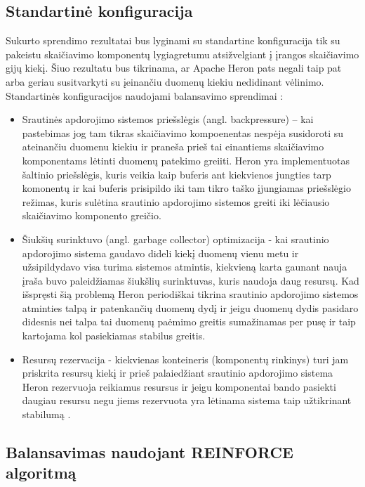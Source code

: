 \documentclass{VUMIFPSbakalaurinis}
\begin{document}
\subsection{Standartinė konfiguracija}
Sukurto sprendimo rezultatai bus lyginami su standartine konfiguracija tik su pakeistu skaičiavimo komponentų lygiagretumu atsižvelgiant į įrangos skaičiavimo gijų kiekį. Šiuo rezultatu bus tikrinama, ar Apache Heron pats negali taip pat arba geriau susitvarkyti su įeinančiu duomenų kiekiu nedidinant vėlinimo. Standartinės konfiguracijos naudojami balansavimo sprendimai \cite{twitterHeron}:
\begin{itemize}
    \item Srautinės apdorojimo sistemos priešslėgis (angl. backpressure) – kai pastebimas jog tam tikras skaičiavimo kompoenentas nespėja susidoroti su ateinančiu duomenu kiekiu ir praneša prieš tai einantiems skaičiavimo komponentams lėtinti duomenų patekimo greiiti. Heron yra implementuotas šaltinio priešslėgis, kuris veikia kaip buferis ant kiekvienos jungties tarp komonentų ir kai buferis prisipildo iki tam tikro taško įjungiamas priešslėgio režimas, kuris sulėtina srautinio apdorojimo sistemos greiti iki lėčiausio skaičiavimo komponento greičio. 
    \item Šiukšių surinktuvo (angl. garbage collector) optimizacija - kai srautinio apdorojimo sistema gaudavo dideli kiekį duomenų vienu metu ir užsipildydavo visa turima sistemos atmintis, kiekvieną karta gaunant nauja įraša buvo paleidžiamas šiukšlių surinktuvas, kuris naudoja daug resursų. Kad išspręsti šią problemą Heron periodiškai tikrina srautinio apdorojimo sistemos atminties talpą ir patenkančių duomenų dydį ir jeigu duomenų dydis pasidaro didesnis nei talpa tai duomenų paėmimo greitis sumažinamas per pusę ir taip kartojama kol pasiekiamas stabilus greitis. 
    \item Resursų rezervacija - kiekvienas konteineris (komponentų rinkinys) turi jam priskrita resursų kiekį ir prieš palaiedžiant srautinio apdorojimo sistema Heron rezervuoja reikiamus resursus ir jeigu komponentai bando pasiekti daugiau resursu negu jiems rezervuota yra lėtinama sistema taip užtikrinant stabilumą \cite{fu2015streaming}.  
\end{itemize}
\subsection{Balansavimas naudojant REINFORCE algoritmą}


\printbibliography[heading=bibintoc] 
\end{document}
